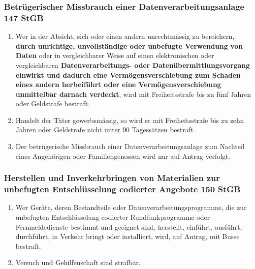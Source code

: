 \documentclass[11pt]{article}
\theoremstyle{definition}
\begin{document}
\subsubsection{Betrügerischer Missbrauch einer Datenverarbeitungsanlage 147 StGB}
\begin{enumerate}[label=\arabic* ]
	\item Wer in der Absicht, sich oder einen andern unrechtmässig zu bereichern, \textbf{durch unrichtige, unvollständige oder unbefugte Verwendung von Daten} oder in vergleichbarer Weise auf einen elektronischen oder vergleichbaren \textbf{Datenverarbeitungs- oder Datenübermittlungsvorgang einwirkt und dadurch eine Vermögensverschiebung zum Schaden eines andern herbeiführt oder eine Vermögensverschiebung unmittelbar darnach verdeckt}, wird mit Freiheitsstrafe bis zu fünf Jahren oder Geldstrafe bestraft.
	\item Handelt der Täter gewerbsmässig, so wird er mit Freiheitsstrafe bis zu zehn Jahren oder Geldstrafe nicht unter 90 Tagessätzen bestraft.
	\item Der betrügerische Missbrauch einer Datenverarbeitungsanlage zum Nachteil eines Angehörigen oder Familiengenossen wird nur auf Antrag verfolgt.
\end{enumerate}

\subsubsection{Herstellen und Inverkehrbringen von Materialien zur unbefugten Entschlüsselung codierter Angebote 150 StGB}
\begin{enumerate}[label=\arabic* ]
	\item Wer Geräte, deren Bestandteile oder Datenverarbeitungsprogramme, die zur unbefugten Entschlüsselung codierter Rundfunkprogramme oder Fernmeldedienste bestimmt und geeignet sind, herstellt, einführt, ausführt, durchführt, in Verkehr bringt oder installiert, wird, auf Antrag, mit Busse bestraft.
	\item Versuch und Gehilfenschaft sind strafbar.
\end{enumerate}
\end{document}
